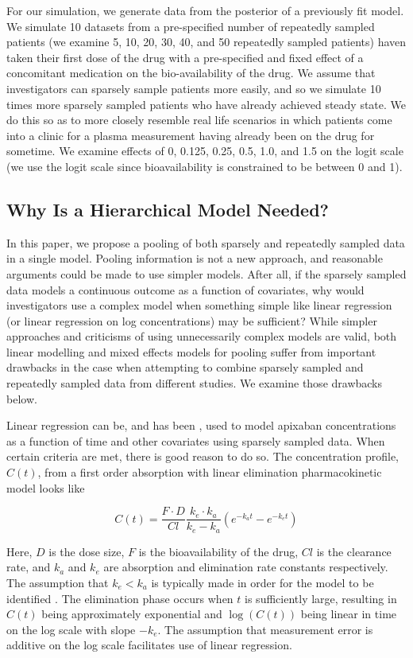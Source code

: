 For our simulation, we generate data from the posterior of a previously fit model. We simulate 10 datasets from a pre-specified number of repeatedly sampled patients (we examine 5, 10, 20, 30, 40, and 50 repeatedly sampled patients) haven taken their first dose of the drug with a pre-specified and fixed effect of a concomitant medication on the bio-availability of the drug.  We assume that investigators can sparsely sample patients more easily, and so we simulate 10 times more sparsely sampled patients who have already achieved steady state. We do this so as to more closely resemble real life scenarios in which patients come into a clinic for a plasma measurement having already been on the drug for sometime. We examine effects of 0, 0.125, 0.25, 0.5, 1.0, and 1.5 on the logit scale (we use the logit scale since bioavailability is constrained to be between 0 and 1). 

\subsection{Why Is a Hierarchical Model Needed?}

In this paper, we propose a pooling of both sparsely and repeatedly sampled data in a single model. Pooling information is not a new approach, and reasonable arguments could be made to use simpler models.  After all, if the sparsely sampled data models a continuous outcome as a function of covariates, why would investigators use a complex model when something simple like linear regression (or linear regression on log concentrations) may be sufficient?  While simpler approaches and criticisms of using unnecessarily complex models are valid, both linear modelling and mixed effects models for pooling suffer from important drawbacks in the case when attempting to combine sparsely sampled and repeatedly sampled data from different studies.  We examine those drawbacks below.

Linear regression can be, and has been \cite{gulilat2020drug,vakkalagadda2016effect}, used to model apixaban concentrations as a function of time and other covariates using sparsely sampled data.  When certain criteria are met, there is good reason to do so.  The concentration profile, $C(t)$, from a first order absorption with linear elimination pharmacokinetic model looks like

$$ C(t) = \frac{F \cdot D}{C l} \frac{k_{e} \cdot k_{a}}{k_{e}-k_{a}}\left(e^{-k_{a}t}-e^{-k_{e}t}\right) $$

\noindent Here, $D$ is the dose size, $F$ is the bioavailability of the drug, $Cl$ is the clearance rate, and $k_a$ and $k_e$ are absorption and elimination rate constants respectively.  The assumption that  $k_e<k_a$ is typically made in order for the model to be identified \cite{wakefield1992bayesian, salway2008gamma}. The elimination phase occurs when $t$ is sufficiently large, resulting in $C(t)$ being approximately exponential and $\log(C(t))$ being linear in time on the log scale with slope $-k_e$.  The assumption that measurement error is additive on the log scale facilitates use of linear regression.

